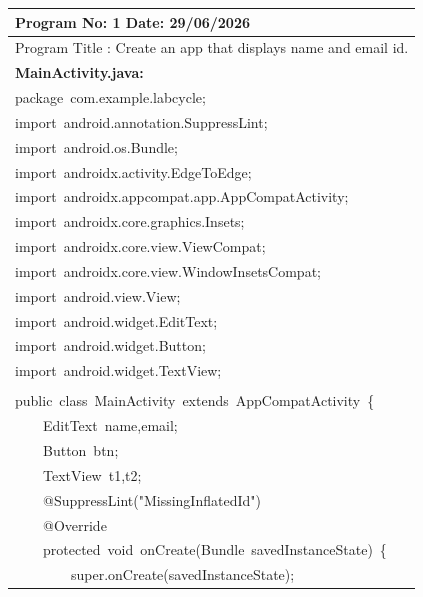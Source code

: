 \documentclass[a4paper,12pt]{article}
\begin{document}
\pagestyle{plain}
\noindent\begingroup
\renewcommand{\arraystretch}{1.1}
\begin{longtable}{|p{}|}
\hline\endfirsthead\hline\endhead\hline\endfoot\hline\endlastfoot
\rule{0pt}{13pt}Program No: 1 \hfill Date: 29/06/2026 \\
\hline
\rule{0pt}{13pt}Program Title : Create an app that displays name and email id. \\
\hline
\rule{0pt}{13pt}\textbf{MainActivity.java:} \\
\hline
{\ttfamily\small package\ com.example.labcycle;} \\
{\ttfamily\small import\ android.annotation.SuppressLint;} \\
{\ttfamily\small import\ android.os.Bundle;} \\
{\ttfamily\small import\ androidx.activity.EdgeToEdge;} \\
{\ttfamily\small import\ androidx.appcompat.app.AppCompatActivity;} \\
{\ttfamily\small import\ androidx.core.graphics.Insets;} \\
{\ttfamily\small import\ androidx.core.view.ViewCompat;} \\
{\ttfamily\small import\ androidx.core.view.WindowInsetsCompat;} \\
{\ttfamily\small import\ android.view.View;} \\
{\ttfamily\small import\ android.widget.EditText;} \\
{\ttfamily\small import\ android.widget.Button;} \\
{\ttfamily\small import\ android.widget.TextView;} \\
\strut \\
{\ttfamily\small public\ class\ MainActivity\ extends\ AppCompatActivity\ \{} \\
{\ttfamily\small \ \ \ \ EditText\ name,email;} \\
{\ttfamily\small \ \ \ \ Button\ btn;} \\
{\ttfamily\small \ \ \ \ TextView\ t1,t2;} \\
{\ttfamily\small \ \ \ \ @SuppressLint("MissingInflatedId")} \\
{\ttfamily\small \ \ \ \ @Override} \\
{\ttfamily\small \ \ \ \ protected\ void\ onCreate(Bundle\ savedInstanceState)\ \{} \\
{\ttfamily\small \ \ \ \ \ \ \ \ super.onCreate(savedInstanceState);} \\

\end{longtable}
\end{document}
